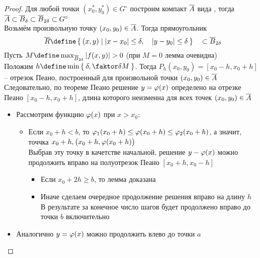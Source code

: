 \begin{proof}
    Для любой точки $ (x_0^*, y_0^*) \in G^\circ $ построим компакт $ \overline{A} $ вида , тогда $ \overline{A} \subset \overline{B}_\delta \subset \overline{B}_{2\delta} \subset G^\circ $ \\
    Возьмём произвольную точку $ (x_0, y_0) \in \overline{A} $. Тогда прямоугольник
    $$ \ol{R} \define \set{(x, y) | {} |x - x_0| \le \delta, \quad | y - y_0| \le \delta} \quad \sub \ol{B}_{2\delta} $$
    Пусть $ M \define \max_{\ol{B}_{2\delta}}|f(x, y)| > 0 $ (при $ M = 0 $ лемма очевидна) \\
    Положим $ h \define \min\set{\delta, \faktor\delta{M}} $. Тогда $ P_h(x_0, y_0) = [x_0 - h, x_0 + h] $ -- отрезок Пеано, построенный для произвольной точки $ (x_0, y_0) \in \overline{A} $ \\
    Следовательно, по теореме Пеано решение  $ y = \varphi(x) $ определено на отрезке Пеано $ [x_0 - h, x_0 + h] $, длина которого неизменна для всех точек $ (x_0, y_0) \in \overline{A} $
    \begin{itemize}
    	\item Рассмотрим функцию $ \varphi(x) $ при $ x > x_0 $:
        \begin{itemize}
        	\item Если $ x_0 + h < b $, то $ \varphi_1(x_0 + h) \le \varphi(x_0 + h) \le \varphi_2(x_0 + h) $, а значит, точчка $ x_0 + h, \big( x_0 + h, \varphi(x_0 + h) \big) $ \\
            Выбрав эту точку в качетстве начальной, решение $ y - \varphi(x) $ можно продолжить вправо на полуотрезок Пеано $ [x_0 + h, x_0 - h] $
            \begin{itemize}
            	\item Если $ x_0 + 2h \ge b $, то лемма доказана
                \item Иначе сделаем очередное продолжение решения вправо на длину $ h $ \\
                В результате за конечное число шагов будет продолжено вправо до точки $ b $ включительно
            \end{itemize}
        \end{itemize}
        \item Аналогично $ y = \varphi(x) $ можно продолжить влево до точки $ a $
    \end{itemize}
\end{proof}

